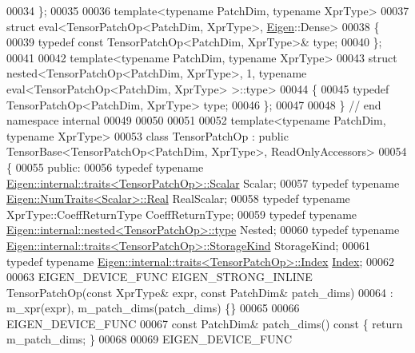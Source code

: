 \begin{DoxyCode}
00034 \};
00035 
00036 \textcolor{keyword}{template}<\textcolor{keyword}{typename} PatchDim, \textcolor{keyword}{typename} XprType>
00037 \textcolor{keyword}{struct }eval<TensorPatchOp<PatchDim, XprType>, \hyperlink{namespace_eigen}{Eigen}::Dense>
00038 \{
00039   \textcolor{keyword}{typedef} \textcolor{keyword}{const} TensorPatchOp<PatchDim, XprType>& type;
00040 \};
00041 
00042 \textcolor{keyword}{template}<\textcolor{keyword}{typename} PatchDim, \textcolor{keyword}{typename} XprType>
00043 \textcolor{keyword}{struct }nested<TensorPatchOp<PatchDim, XprType>, 1, typename eval<TensorPatchOp<PatchDim, XprType> >::type>
00044 \{
00045   \textcolor{keyword}{typedef} TensorPatchOp<PatchDim, XprType> type;
00046 \};
00047 
00048 \}  \textcolor{comment}{// end namespace internal}
00049 
00050 
00051 
00052 \textcolor{keyword}{template}<\textcolor{keyword}{typename} PatchDim, \textcolor{keyword}{typename} XprType>
00053 \textcolor{keyword}{class }TensorPatchOp : \textcolor{keyword}{public} TensorBase<TensorPatchOp<PatchDim, XprType>, ReadOnlyAccessors>
00054 \{
00055   \textcolor{keyword}{public}:
00056   \textcolor{keyword}{typedef} \textcolor{keyword}{typename} \hyperlink{struct_eigen_1_1internal_1_1traits}{Eigen::internal::traits<TensorPatchOp>::Scalar}
       Scalar;
00057   \textcolor{keyword}{typedef} \textcolor{keyword}{typename} \hyperlink{group___sparse_core___module}{Eigen::NumTraits<Scalar>::Real} RealScalar;
00058   \textcolor{keyword}{typedef} \textcolor{keyword}{typename} XprType::CoeffReturnType CoeffReturnType;
00059   \textcolor{keyword}{typedef} \textcolor{keyword}{typename} \hyperlink{class_eigen_1_1internal_1_1_tensor_lazy_evaluator_writable}{Eigen::internal::nested<TensorPatchOp>::type}
       Nested;
00060   \textcolor{keyword}{typedef} \textcolor{keyword}{typename} \hyperlink{struct_eigen_1_1internal_1_1traits}{Eigen::internal::traits<TensorPatchOp>::StorageKind}
       StorageKind;
00061   \textcolor{keyword}{typedef} \textcolor{keyword}{typename} \hyperlink{struct_eigen_1_1internal_1_1traits}{Eigen::internal::traits<TensorPatchOp>::Index}
       \hyperlink{namespace_eigen_a62e77e0933482dafde8fe197d9a2cfde}{Index};
00062 
00063   EIGEN\_DEVICE\_FUNC EIGEN\_STRONG\_INLINE TensorPatchOp(\textcolor{keyword}{const} XprType& expr, \textcolor{keyword}{const} PatchDim& patch\_dims)
00064       : m\_xpr(expr), m\_patch\_dims(patch\_dims) \{\}
00065 
00066     EIGEN\_DEVICE\_FUNC
00067     \textcolor{keyword}{const} PatchDim& patch\_dims()\textcolor{keyword}{ const }\{ \textcolor{keywordflow}{return} m\_patch\_dims; \}
00068 
00069     EIGEN\_DEVICE\_FUNC

\end{DoxyCode}
